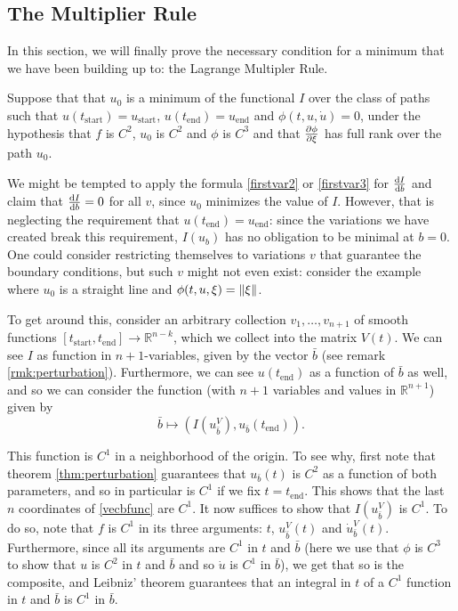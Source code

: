 \documentclass{article}
\theoremstyle{plain}
\theoremstyle{plain}
\theoremstyle{nonumberplain}
\theoremstyle{empty}
\newcommand{\R}{\mathbb{R}}
\newcommand{\tstart}{\mathrm{start}}
\newcommand{\tend}{\mathrm{end}}
\DeclarePairedDelimiter\norm{\lVert}{\rVert}
\newcommand{\vecb}{{\bar{b}}}
\begin{document}
\subsection{The Multiplier Rule}\label{sec:multrule}

In this section, we will finally prove the necessary condition for a minimum that we have been building up to: the Lagrange Multipler Rule.

Suppose that that $u_0$ is a minimum of the functional $I$ over the class of paths such that $u(t_\tstart) = u_\tstart$, $u(t_\tend) = u_\tend$ and $\phi(t,u,\dot u) = 0$, under the hypothesis that $f$ is $C^2$, $u_0$ is $C^2$ and $\phi$ is $C^3$ and that $\diffp \phi \xi$ has full rank over the path $u_0$.

We might be tempted to apply the formula \eqref{firstvar2} or \eqref{firstvar3} for $\diff I b$ and claim that $\diff I b = 0$ for all $v$, since $u_0$ minimizes the value of $I$. However, that is neglecting the requirement that $u(t_\tend) = u_\tend$: since the variations we have created break this requirement, $I(u_b)$ has no obligation to be minimal at $b = 0$. One could consider restricting themselves to variations $v$ that guarantee the boundary conditions, but such $v$ might not even exist: consider the example where $u_0$ is a straight line and $\phi(t,u,\xi) = \norm \xi$.

To get around this, consider an arbitrary collection $v_1, \dots, v_{n+1}$ of smooth functions $[t_\tstart, t_\tend] \to \R^{n-k}$, which we collect into the matrix $V(t)$. We can see $I$ as function in $n+1$-variables, given by the vector $\vecb$ (see remark \ref{rmk:perturbation}). Furthermore, we can see $u(t_\tend)$ as a function of $\vecb$ as well, and so we can consider the function (with $n+1$ variables and values in $\R^{n+1}$) given by
\begin{equation}\label{vecbfunc}
\vecb \mapsto (I(u_\vecb^V), u_\vecb(t_\tend)).
\end{equation}

This function is $C^1$ in a neighborhood of the origin. To see why, first note that theorem \ref{thm:perturbation} guarantees that $u_\vecb(t)$ is $C^2$ as a function of both parameters, and so in particular is $C^1$ if we fix $t = t_\tend$. This shows that the last $n$ coordinates of \eqref{vecbfunc} are $C^1$. It now suffices to show that $I(u_\vecb^V)$ is $C^1$. To do so, note that $f$ is $C^1$ in its three arguments: $t$, $u_\vecb^V(t)$ and $\dot u_\vecb^V(t)$. Furthermore, since all its arguments are $C^1$ in $t$ and $\vecb$ (here we use that $\phi$ is $C^3$ to show that $u$ is $C^2$ in $t$ and $\vecb$ and so $\dot u$ is $C^1$ in $\vecb$), we get that so is the composite, and Leibniz' theorem guarantees that an integral in $t$ of a $C^1$ function in $t$ and $\vecb$ is $C^1$ in $\vecb$.
\end{document}
